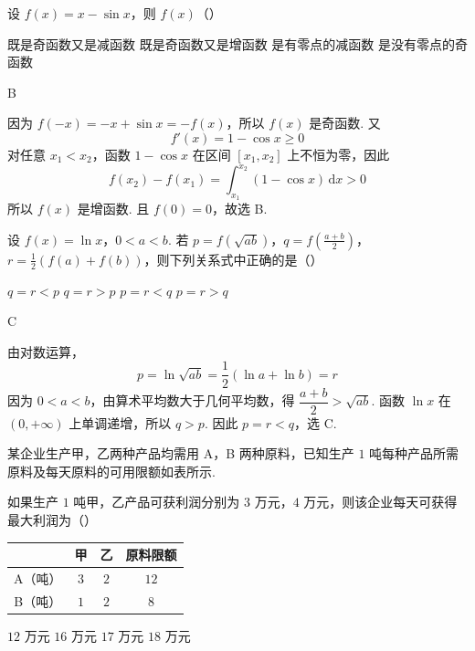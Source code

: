 \begin{problem}
设 \(f(x) = x - \sin x\)，则 \(f(x)\)（\quad）

\choices
    {既是奇函数又是减函数}
    {既是奇函数又是增函数}
    {是有零点的减函数}
    {是没有零点的奇函数}
\end{problem}

\begin{answer}
B
\end{answer}

\begin{solution}
因为 \(f(-x)=-x+\sin x=-f(x)\)，所以 \(f(x)\) 是奇函数. 又
\[
f'(x)=1-\cos x\geqslant0
\]
对任意 \(x_1<x_2\)，函数 \(1-\cos x\) 在区间 \([x_1,x_2]\) 上不恒为零，因此
\[
f(x_2)-f(x_1)=\int_{x_1}^{x_2}(1-\cos x)\,\mathrm{d}x>0
\]
所以 \(f(x)\) 是增函数. 且 \(f(0)=0\)，故选 B.
\end{solution}

\begin{problem}
设 \(f(x) = \ln x\)，\(0 < a < b\). 若 \(p = f\left(\sqrt{ab}\right)\)，\(q = f\left(\frac{a + b}{2}\right)\)，\(r = \frac{1}{2}(f(a) + f(b))\)，则下列关系式中正确的是（\quad）

\choices
    {\(q = r < p\)}
    {\(q = r > p\)}
    {\(p = r < q\)}
    {\(p = r > q\)}
\end{problem}

\begin{answer}
C
\end{answer}

\begin{solution}
由对数运算，
\[
p=\ln\sqrt{ab}=\frac{1}{2}(\ln a+\ln b)=r
\]
因为 \(0<a<b\)，由算术平均数大于几何平均数，得 \(\dfrac{a+b}{2}>\sqrt{ab}\). 函数 \(\ln x\) 在 \((0,+\infty)\) 上单调递增，所以 \(q>p\). 因此 \(p=r<q\)，选 C.
\end{solution}

\begin{problem}
某企业生产甲，乙两种产品均需用 A，B 两种原料，已知生产 \(1\text{ 吨}\)每种产品所需原料及每天原料的可用限额如表所示.

如果生产 \(1\text{ 吨}\)甲，乙产品可获利润分别为 \(3\text{ 万元}\)，\(4\text{ 万元}\)，则该企业每天可获得最大利润为（\quad）

\begin{center}
\begin{tabular}{|c|c|c|c|}
\hline
 & 甲 & 乙 & 原料限额 \\
\hline
 A（吨） & \(3\) & \(2\) & \(12\) \\
\hline
 B（吨） & \(1\) & \(2\) & \(8\) \\
\hline
\end{tabular}
\end{center}

\choices
    {\(12\text{ 万元}\)}
    {\(16\text{ 万元}\)}
    {\(17\text{ 万元}\)}
    {\(18\text{ 万元}\)}
\end{problem}

